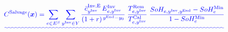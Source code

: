 \documentclass[preprint,12pt]{elsarticle}
\providecommand{\DIFadd}[1]{{\protect\color{blue}\uwave{#1}}} %
\providecommand{\DIFaddbegin}{} %
\providecommand{\DIFaddend}{} %
\providecommand{\DIFdelbegin}{} %
\providecommand{\DIFdelend}{} %
\begin{document}
    \DIFdelbegin %
\DIFdelend \DIFaddbegin \begin{equation}
        \DIFadd{C^\text{Salvage}(\boldsymbol{x}) =
        \sum_{e \in E^S} \sum_{y^\text{Inv} \in Y}
        \frac{\bar{c}^{\text{Inv,E}}_{y^\text{Inv}}\, E^{\text{Inv}}_{e,y^\text{Inv}}}{(1+r)^{\,y^\text{End}-y_0}}
        \;\frac{T^\text{Rem}_{e,y^\text{Inv}}}{T^\text{Cal}_{e,y^\text{Inv}}}
        \;\frac{SoH_{e,y^\text{Inv},y^\text{End}} - SoH^{\text{Min}}_e}{1 - SoH^{\text{Min}}_e}
        \label{eq:salvage_credit}
    }\end{equation}
\DIFaddend 
\end{document}
